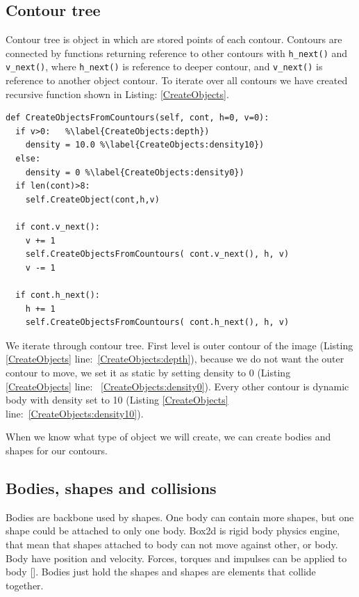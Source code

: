 \documentclass{ifacconf}
\begin{document}
\subsection{Contour tree}
Contour tree is object in which are stored points of each contour. Contours are
connected by functions returning reference to other contours with
\lstinline{h_next()} and \lstinline{v_next()}, where \lstinline{h_next()} is
reference to deeper contour, and \lstinline{v_next()} is reference to another
object contour. To iterate over all contours we have created recursive function
shown in Listing: \ref{CreateObjects}.

\begin{lstlisting}[label=CreateObjects,caption=Function to iterate through contour tree]
def CreateObjectsFromCountours(self, cont, h=0, v=0):
  if v>0:	%\label{CreateObjects:depth})
    density = 10.0 %\label{CreateObjects:density10})
  else:
    density = 0 %\label{CreateObjects:density0})
  if len(cont)>8:
    self.CreateObject(cont,h,v) 

  if cont.v_next():
    v += 1
    self.CreateObjectsFromCountours( cont.v_next(), h, v)
    v -= 1

  if cont.h_next():
    h += 1
    self.CreateObjectsFromCountours( cont.h_next(), h, v)
\end{lstlisting}

We iterate through contour tree. First level is outer contour of the image
(Listing \ref{CreateObjects} line:~\ref{CreateObjects:depth}), because we do not
want the outer contour to move, we set it as static by setting density to 0
(Listing \ref{CreateObjects} line:~ \ref{CreateObjects:density0}). Every other
contour is dynamic body with density set to 10 (Listing \ref{CreateObjects}
line:~\ref{CreateObjects:density10}).

When we know what type of object we will create, we can create bodies and
shapes for our contours.
\subsection{Bodies, shapes and collisions}
Bodies are backbone used by shapes. One body can contain more shapes, but one
shape could be attached to only one body. Box2d is rigid body physics engine,
that mean that shapes attached to body can not move against other, or body. Body
have position and velocity. Forces, torques and impulses can be applied to body
[\cite{Box2DManual}]. Bodies just hold the shapes and shapes are elements that
collide together.
\end{document}
